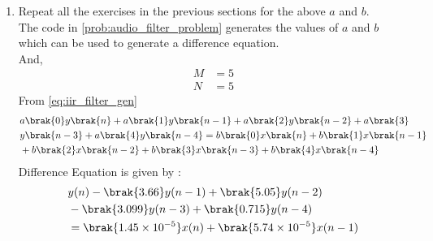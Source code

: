 \documentclass[journal,12pt,twocolumn]{IEEEtran}
\theoremstyle{remark}
\begin{document}
\begin{enumerate}[label=\thesection.\arabic*]
																																																																																			 \item Repeat all the exercises in the previous sections for the above $a$ and $b$.\\
																																																																																			 \solution The code in \ref{prob:audio_filter_problem} generates the values of $a$ and $b$  which can be used to generate a difference equation.\\
																																																																																			 And,
																																																																																			 \begin{align}
																																																																																			     M &= 5\\
																																																																																			         N&=5
																																																																																				 \end{align}
																																																																																				 From \ref{eq:iir_filter_gen} 
																																																																																				 \begin{align}
																																																																																				     &a\brak{0}y\brak{n} + a\brak{1}y\brak{n-1}+a\brak{2}y\brak{n-2}+a\brak{3}\\ \notag &y\brak{n-3} + a\brak{4}y\brak{n-4} =   b\brak{0}x\brak{n} + b\brak{1}x\brak{n-1}\\ \notag &+b\brak{2}x\brak{n-2}+b\brak{3}x\brak{n-3} + b\brak{4}x\brak{n-4} 
																																																																																				     \end{align}
																																																																																				     Difference Equation is given by :
																																																																																				     \begin{align}
																																																																																				     	&y(n) - \brak{3.66}y(n - 1) + \brak{5.05}y(n - 2) \nonumber \\
																																																																																						&- \brak{3.099}y(n - 3) + \brak{0.715}y(n - 4) \nonumber \\
																																																																																							&= \brak{1.45\times 10^{-5}}x(n) + \brak{5.74 \times 10^{-5}}x(n - 1) \nonumber \\

\end{align}
\end{enumerate}
\end{document}
